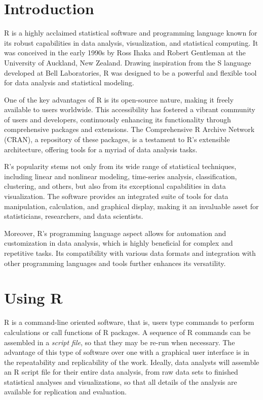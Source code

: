 %
%

\section{Introduction}

R is a highly acclaimed statistical software and programming language known for its robust capabilities in data analysis, visualization, and statistical computing. It was conceived in the early 1990s by Ross Ihaka and Robert Gentleman at the University of Auckland, New Zealand. Drawing inspiration from the S language developed at Bell Laboratories, R was designed to be a powerful and flexible tool for data analysis and statistical modeling.

One of the key advantages of R is its open-source nature, making it freely available to users worldwide. This accessibility has fostered a vibrant community of users and developers, continuously enhancing its functionality through comprehensive packages and extensions. The Comprehensive R Archive Network (CRAN), a repository of these packages, is a testament to R's extensible architecture, offering tools for a myriad of data analysis tasks.

R's popularity stems not only from its wide range of statistical techniques, including linear and nonlinear modeling, time-series analysis, classification, clustering, and others, but also from its exceptional capabilities in data visualization. The software provides an integrated suite of tools for data manipulation, calculation, and graphical display, making it an invaluable asset for statisticians, researchers, and data scientists.

Moreover, R's programming language aspect allows for automation and customization in data analysis, which is highly beneficial for complex and repetitive tasks. Its compatibility with various data formats and integration with other programming languages and tools further enhances its versatility.

\section{Using R}

R is a command-line oriented software, that is, users type commands to perform calculations or call functions of R packages. A sequence of R commands can be assembled in a \emph{script file}, so that they may be re-run when necessary. The advantage of this type of software over one with a graphical user interface is in the repeatability and replicability of the work. Ideally, data analysts will assemble an R script file for their entire data analysis, from raw data sets to finished statistical analyses and visualizations, so that all details of the analysis are available for replication and evaluation.


